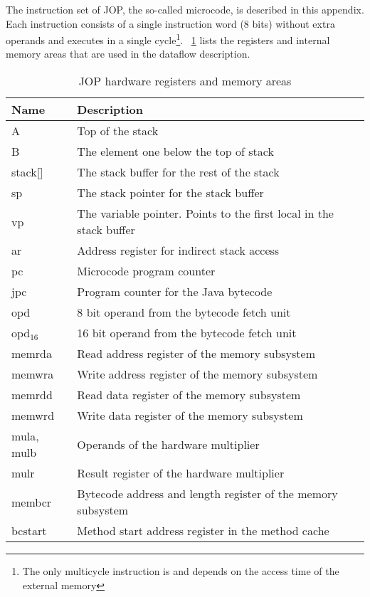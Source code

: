 %

The instruction set of JOP, the so-called microcode, is described in
this appendix. Each instruction consists of a single instruction
word (8 bits) without extra operands and executes in a single
cycle\footnote{The only multicycle instruction is 
and depends on the access time of the external memory}.
\tablename~\ref{tab:appendix:hwreg} lists the registers and internal
memory areas that are used in the dataflow description.

\begin{table}[h]
  \centering
  \begin{tabular}{ll}
    \toprule
    Name & Description \\
    \midrule
    A & Top of the stack\\
    B & The element one below the top of stack\\
    stack[] & The stack buffer for the rest of the stack\\
    sp & The stack pointer for the stack buffer\\
    vp & The variable pointer. Points to the first local in
    the stack buffer\\
    ar & Address register for indirect stack access\\
    pc & Microcode program counter\\
    jpc & Program counter for the Java bytecode\\
    opd & 8 bit operand from the bytecode fetch unit\\
    opd$_{16}$ & 16 bit operand from the bytecode fetch unit\\
    memrda & Read address register of the memory subsystem\\
    memwra & Write address register of the memory subsystem\\
    memrdd & Read data register of the memory subsystem\\
    memwrd & Write data register of the memory subsystem\\
    mula, mulb & Operands of the hardware multiplier\\
    mulr & Result register of the hardware multiplier\\
    membcr & Bytecode address and length register of the memory
    subsystem\\
    bcstart & Method start address register in the method cache\\
    \bottomrule
  \end{tabular}
  \caption{JOP hardware registers and memory areas}\label{tab:appendix:hwreg}
\end{table}

\clearpage



%
